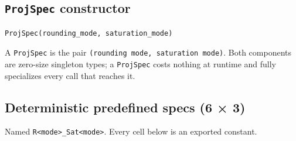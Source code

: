 \subsection{\texttt{ProjSpec} constructor}



\label{14281805247734099455}{}



\begin{verbatim}
ProjSpec(rounding_mode, saturation_mode)
\end{verbatim}



A \texttt{ProjSpec} is the pair \texttt{(\allowbreak{}rounding mode, saturation mode)}. Both components are zero-size singleton types; a \texttt{ProjSpec} costs nothing at runtime and fully specializes every call that reaches it.



\subsection{Deterministic predefined specs (6 × 3)}



\label{12417255764667262599}{}


Named \texttt{R<mode>\_\allowbreak{}Sat<mode>}. Every cell below is an exported constant.




